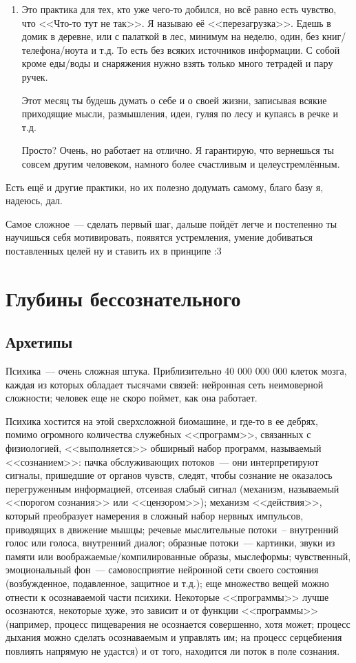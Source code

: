 \documentclass[a4paper,14pt,oneside]{memoir}
\begin{document}
\begin{enumerate}
\item Это практика для тех, кто уже чего-то добился, но всё равно есть чувство, что <<Что-то тут не так>>. Я называю её <<перезагрузка>>. Едешь в домик в деревне, или с палаткой в лес, минимум на неделю, один, без книг/телефона/ноута и т.д. То есть без всяких источников информации. С собой кроме еды/воды и снаряжения нужно взять только много тетрадей и пару ручек.

Этот месяц ты будешь думать о себе и о своей жизни, записывая всякие приходящие мысли, размышления, идеи, гуляя по лесу и купаясь в речке и т.д.

Просто? Очень, но работает на отлично. Я гарантирую, что вернешься ты совсем другим человеком, намного более счастливым и целеустремлённым.
\end{enumerate}

Есть ещё и другие практики, но их полезно додумать самому, благо базу я, надеюсь, дал.

Самое сложное~--- сделать первый шаг, дальше пойдёт легче и постепенно ты научишься себя мотивировать, появятся устремления, умение добиваться поставленных целей ну и ставить их в принципе :3



\chapter{Глубины бессознательного}



\section{Архетипы}

Психика~--- очень сложная штука. Приблизительно 40 000 000 000 клеток мозга, каждая из которых обладает тысячами связей: нейронная сеть неимоверной сложности; человек еще не скоро поймет, как она работает.

Психика хостится на этой сверхсложной биомашине, и где-то в ее дебрях, помимо огромного количества служебных <<программ>>, связанных с физиологией, <<выполняется>> обширный набор программ, называемый <<сознанием>>: пачка обслуживающих потоков~--- они интерпретируют сигналы, пришедшие от органов чувств, следят, чтобы сознание не оказалось перегруженным информацией, отсеивая слабый сигнал (механизм, называемый <<порогом сознания>> или <<цензором>>); механизм <<действия>>, который преобразует намерения в сложный набор нервных импульсов, приводящих в движение мышцы; речевые мыслительные потоки~-- внутренний голос или голоса, внутренний диалог; образные потоки~--- картинки, звуки из памяти или воображаемые/компилированные образы, мыслеформы; чувственный, эмоциональный фон~--- самовосприятие нейронной сети своего состояния (возбужденное, подавленное, защитное и т.д.); еще множество вещей можно отнести к осознаваемой части психики. Некоторые <<программы>> лучше осознаются, некоторые хуже, это зависит и от функции <<программы>> (например, процесс пищеварения не осознается совершенно, хотя может; процесс дыхания можно сделать осознаваемым и управлять им; на процесс серцебиения повлиять напрямую не удастся) и от того, находится ли поток в поле сознания.
\end{document}

